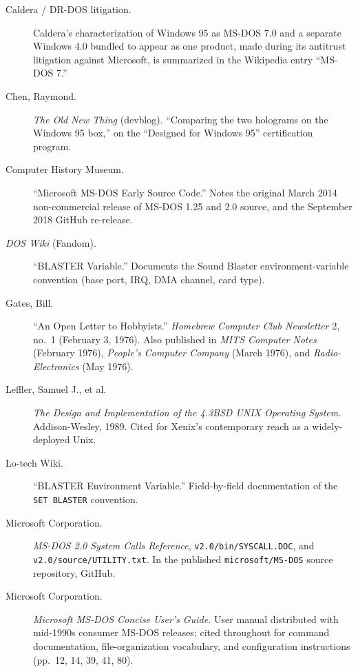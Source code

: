 \documentclass[11pt]{book}
\begin{document}
\begin{description}
\item[Caldera / DR-DOS litigation.] Caldera's characterization of Windows 95 as MS-DOS 7.0 and a separate Windows 4.0 bundled to appear as one product, made during its antitrust litigation against Microsoft, is summarized in the Wikipedia entry \enquote{MS-DOS 7.}

\item[Chen, Raymond.] \emph{The Old New Thing} (devblog). \enquote{Comparing the two holograms on the Windows 95 box,} on the \enquote{Designed for Windows 95} certification program.

\item[Computer History Museum.] \enquote{Microsoft MS-DOS Early Source Code.} Notes the original March 2014 non-commercial release of MS-DOS 1.25 and 2.0 source, and the September 2018 GitHub re-release.

\item[\emph{DOS Wiki} (Fandom).] \enquote{BLASTER Variable.} Documents the Sound Blaster environment-variable convention (base port, IRQ, DMA channel, card type).

\item[Gates, Bill.] \enquote{An Open Letter to Hobbyists.} \emph{Homebrew Computer Club Newsletter} 2, no.\ 1 (February 3, 1976). Also published in \emph{MITS Computer Notes} (February 1976), \emph{People's Computer Company} (March 1976), and \emph{Radio-Electronics} (May 1976).

\item[Leffler, Samuel J., et al.] \emph{The Design and Implementation of the 4.3BSD UNIX Operating System.} Addison-Wesley, 1989. Cited for Xenix's contemporary reach as a widely-deployed Unix.

\item[Lo-tech Wiki.] \enquote{BLASTER Environment Variable.} Field-by-field documentation of the \texttt{SET BLASTER} convention.

\item[Microsoft Corporation.] \emph{MS-DOS 2.0 System Calls Reference}, \texttt{v2.0/bin/SYSCALL.DOC}, and \texttt{v2.0/source/UTILITY.txt}. In the published \texttt{microsoft/MS-DOS} source repository, GitHub.

\item[Microsoft Corporation.] \emph{Microsoft MS-DOS Concise User's Guide.} User manual distributed with mid-1990s consumer MS-DOS releases; cited throughout for command documentation, file-organization vocabulary, and configuration instructions (pp.\ 12, 14, 39, 41, 80).


\end{description}
\end{document}
